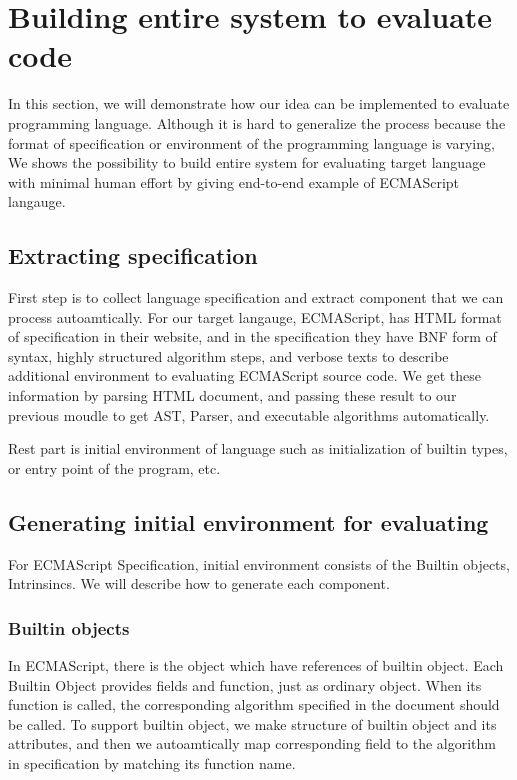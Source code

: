 \section{Building entire system to evaluate code}

In this section, we will demonstrate how our idea can be implemented to evaluate programming language. Although it is hard to generalize the process because the format of specification or 
environment of the programming language is varying, We shows the possibility to build entire system for evaluating target language with minimal human effort by giving end-to-end example of ECMAScript langauge.

\subsection{Extracting specification}
First step is to collect language specification and extract component that we can process autoamtically. For our target langauge, ECMAScript, has HTML format of specification in their website, and
in the specification they have BNF form of syntax, highly structured algorithm steps, and verbose texts to describe additional environment to evaluating ECMAScript source code.
We get these information by parsing HTML document, and passing these result to our previous moudle to get AST, Parser, and executable algorithms automatically.

Rest part is initial environment of language such as initialization of builtin types, or entry point of the program, etc.

\subsection{Generating initial environment for evaluating}
For ECMAScript Specification, initial environment consists of the Builtin objects, Intrinsincs. We will describe how to generate each component.

\subsubsection{Builtin objects}

 In ECMAScript, there is the object which have references of builtin object. Each Builtin Object provides fields and function, just as ordinary object. When its function is called,
 the corresponding algorithm specified in the document should be called. To support builtin object, we make structure of builtin object and its attributes, and then we autoamtically map corresponding field to the algorithm in specification by matching its function name.
 
